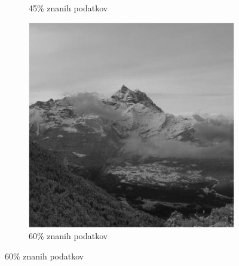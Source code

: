 \documentclass{beamer}
\begin{document}
\begin{frame}
\begin{figure}
\begin{subfigure}{0.325\linewidth}
      \caption{45\% znanih podatkov}
    \end{subfigure}
    \begin{subfigure}{0.325\linewidth}
      \includegraphics[width=\linewidth]{slike/gora/slikaRez60TNNM.png}
      \caption{60\% znanih podatkov}
    \end{subfigure}
  \end{figure}
\end{frame}
\end{document}
